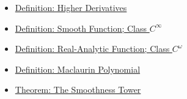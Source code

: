 \begin{dependencies}
\begin{itemize}
  \item \hyperref[def:higher-derivatives]{Definition: Higher Derivatives}
  \item \hyperref[def:class-cinfty]{Definition: Smooth Function; Class \(C^\infty\)}
  \item \hyperref[def:class-comega]{Definition: Real-Analytic Function; Class \(C^\omega\)}
  \item \hyperref[def:maclaurin-polynomial]{Definition: Maclaurin Polynomial}
  \item \hyperref[thm:smoothness-tower]{Theorem: The Smoothness Tower}
\end{itemize}
\end{dependencies}
